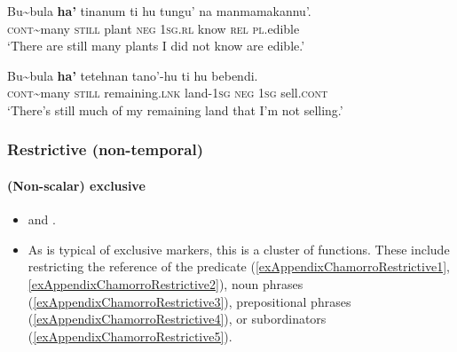 \begin{exe}
	\ex
\gll Bu\sim{}bula \textbf{ha'} tinanum ti hu tungu' na manmamakannu'.\\
	\textsc{cont}\sim{}many \textsc{still} plant \textsc{neg} 1\textsc{sg}.\textsc{rl} know \textsc{rel} \textsc{pl}.edible\\
	\glt \lq There are still many plants I did not know are edible.\rq{ }\parencite[325]{Chung2020}

	\ex
	\gll  Bu\sim{}bula  \textbf{ha’} tetehnan tano’-hu ti hu bebendi.\\
	\textsc{cont}\sim{}many \textsc{still} remaining.\textsc{lnk} land-1\textsc{sg} \textsc{neg} 1\textsc{sg} sell.\textsc{cont}\\
	\glt \lq There's still much of my remaining land that I'm not selling.\rq{ }\parencite[382]{Chung2020}
\end{exe}

\subsubsection{Restrictive (non-temporal)}
\paragraph{(Non-scalar) exclusive}
\label{appendixChamorroRestrictive}
\begin{itemize}
	\item \textcite[513–516]{Chung2020} and \textcite[216–217]{Topping1973}.
	\item As is typical of exclusive markers, this is a cluster of functions. These include restricting the reference of the predicate (\ref{exAppendixChamorroRestrictive1}, \ref{exAppendixChamorroRestrictive2}), noun phrases (\ref{exAppendixChamorroRestrictive3}), prepositional phrases (\ref{exAppendixChamorroRestrictive4}), or subordinators (\ref{exAppendixChamorroRestrictive5}).
\end{itemize}

